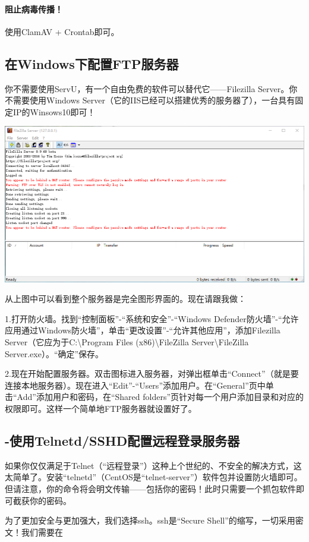 \paragraph{阻止病毒传播！}使用ClamAV + Crontab即可。
\subsection{在Windows下配置FTP服务器}
你不需要使用ServU，有一个自由免费的软件可以替代它——Filezilla Server。你不需要使用Windows Server（它的IIS已经可以搭建优秀的服务器了），一台具有固定IP的Winsows10即可！
\begin{center}
	\includegraphics[scale=0.6]{pic/fzs}
\end{center} \par
从上图中可以看到整个服务器是完全图形界面的。现在请跟我做：\par
1.打开防火墙。找到“控制面板”-“系统和安全”-“Windows Defender防火墙”-“允许应用通过Windows防火墙”，单击“更改设置”-“允许其他应用”，添加Filezilla Server（它应为于C:\textbackslash Program Files (x86)\textbackslash FileZilla Server\textbackslash FileZilla Server.exe）。“确定”保存。\par
2.现在开始配置服务器。双击图标进入服务器，对弹出框单击“Connect”（就是要连接本地服务器）。现在进入“Edit”-“Users”添加用户。在“General”页中单击“Add”添加用户和密码，在“Shared folders”页针对每一个用户添加目录和对应的权限即可。这样一个简单地FTP服务器就设置好了。
\subsection{-使用Telnetd/SSHD配置远程登录服务器}
如果你仅仅满足于Telnet（“远程登录”）这种上个世纪的、不安全的解决方式，这太简单了。安装“telnetd”（CentOS是“telnet-server”）软件包并设置防火墙即可。但请注意，你的命令将会明文传输——包括你的密码！此时只需要一个抓包软件即可截获你的密码。\par
为了更加安全与更加强大，我们选择ssh。ssh是“Secure Shell”的缩写，一切采用密文！我们需要在
